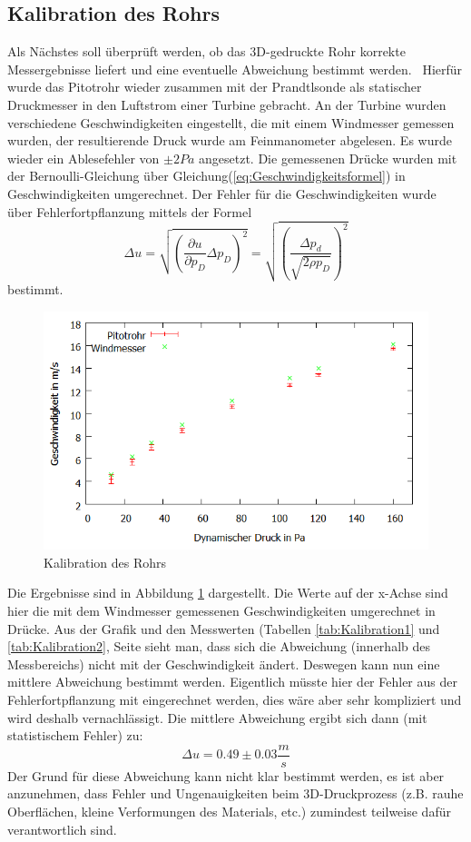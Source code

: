\subsection{Kalibration des Rohrs}
Als Nächstes soll überprüft werden, ob das 3D-gedruckte Rohr korrekte Messergebnisse liefert und eine eventuelle Abweichung bestimmt werden.
\
Hierfür wurde das Pitotrohr wieder zusammen mit der Prandtlsonde als statischer Druckmesser in den Luftstrom einer Turbine gebracht. An der Turbine wurden verschiedene Geschwindigkeiten eingestellt, die mit einem Windmesser gemessen wurden, der resultierende Druck wurde am Feinmanometer abgelesen. Es wurde wieder ein Ablesefehler von $\pm 2 Pa$ angesetzt. Die gemessenen Drücke wurden mit der Bernoulli-Gleichung über Gleichung(\ref{eq:Geschwindigkeitsformel}) in Geschwindigkeiten umgerechnet.
Der Fehler für die Geschwindigkeiten wurde über Fehlerfortpflanzung mittels der Formel
\begin{equation}
\Delta u=\sqrt{(\frac{\partial u}{\partial p_D}\Delta p_D)^2}=\sqrt{(\frac{\Delta p_d}{\sqrt{2\rho p_D}})^2}
\label{eq:Fehlerfortpflanzung}
\end{equation}
bestimmt.
\begin{figure}
      \includegraphics[width=.9\textwidth]{images/Kalibration}
\caption{Kalibration des Rohrs}
\label{fig:Kalibration}
\end{figure}
Die Ergebnisse sind in Abbildung \ref{fig:Kalibration} dargestellt. Die Werte auf der x-Achse sind hier die mit dem Windmesser gemessenen Geschwindigkeiten umgerechnet in Drücke. Aus der Grafik und den Messwerten (Tabellen \ref{tab:Kalibration1} und \ref{tab:Kalibration2}, Seite \pageref{tab:Kalibration2} sieht man, dass sich die Abweichung (innerhalb des Messbereichs) nicht mit der Geschwindigkeit ändert. Deswegen kann nun eine mittlere Abweichung bestimmt werden. Eigentlich müsste hier der Fehler aus der Fehlerfortpflanzung mit eingerechnet werden, dies wäre aber sehr kompliziert und wird deshalb vernachlässigt. Die mittlere Abweichung ergibt sich dann (mit statistischem Fehler) zu:
\begin{equation}
\Delta u= 0.49 \pm 0.03 \frac{m}{s}
\label{eq:Abweichung}
\end{equation}
Der Grund für diese Abweichung kann nicht klar bestimmt werden, es ist aber anzunehmen, dass Fehler und Ungenauigkeiten beim 3D-Druckprozess (z.B. rauhe Oberflächen, kleine Verformungen des Materials, etc.) zumindest teilweise dafür verantwortlich sind.
